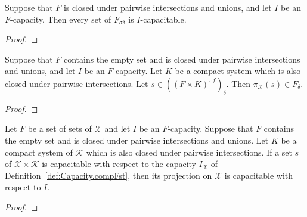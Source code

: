 \begin{lemma}\label{lem:isCapacitable_of_mem_countableInfClosure_countableSupClosure}
  \leanok
Suppose that $F$ is closed under pairwise intersections and unions, and let $I$ be an $F$-capacity.
Then every set of $F_{\sigma \delta}$ is $I$-capacitable.
\end{lemma}

\begin{proof}\leanok

\end{proof}


\begin{lemma}\label{lem:fst_image_mem_countableInfClosure}
  \leanok
Suppose that $F$ contains the empty set and is closed under pairwise intersections and unions, and let $I$ be an $F$-capacity.
Let $K$ be a compact system which is also closed under pairwise intersections.
Let $s \in ((F \times K)^{\cup f})_\delta$.
Then $\pi_{\mathcal{X}}(s) \in F_\delta$.
\end{lemma}

\begin{proof}\leanok

\end{proof}


\begin{lemma}\label{lem:IsCapacitable.fst}
  \leanok
Let $F$ be a set of sets of $\mathcal{X}$ and let $I$ be an $F$-capacity.
Suppose that $F$ contains the empty set and is closed under pairwise intersections and unions.
Let $K$ be a compact system of $\mathcal{K}$ which is also closed under pairwise intersections.
If a set $s$ of $\mathcal{X} \times \mathcal{K}$ is capacitable with respect to the capacity $I_{\mathcal{X}}$ of Definition~\ref{def:Capacity.compFst}, then its projection on $\mathcal{X}$ is capacitable with respect to $I$.
\end{lemma}

\begin{proof}\leanok

\end{proof}


